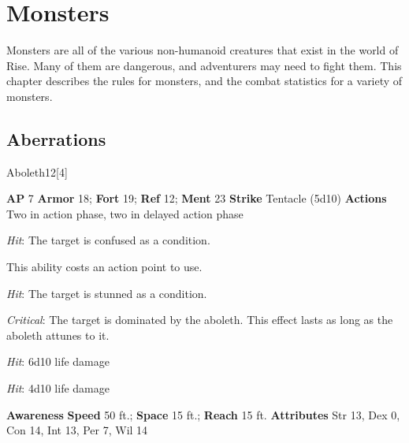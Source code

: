 \chapter{Monsters}
Monsters are all of the various non-humanoid creatures that exist in the world of Rise.
Many of them are dangerous, and adventurers may need to fight them.
This chapter describes the rules for monsters, and the combat statistics for a variety of monsters.
\section{Aberrations}
\begin{monsection}{Aboleth}{12}[4]
\vspace{-1em}\vspace{-1em}
\begin{spellcontent}
\begin{spelltargetinginfo}
{\textbf{AP} 7}
\pari \textbf{Armor} 18;
\textbf{Fort} 19;
\textbf{Ref} 12;
\textbf{Ment} 23
\pari \textbf{Strike} Tentacle  (5d10)
\pari \textbf{Actions} Two in action phase, two in delayed action phase
\end{spelltargetinginfo}
\begin{spelleffects}
\pari
{}
\par
\par \textit{Hit}: The target is confused as a condition.
\vspace{0.5em}
\pari
{}
\par
This ability costs an action point to use.
\par \textit{Hit}: The target is stunned as a condition.
\par \textit{Critical}:
The target is dominated by the aboleth.
This effect lasts as long as the aboleth attunes to it.
\vspace{0.5em}
\pari
{}
\par
\par \textit{Hit}: 6d10 life damage
\vspace{0.5em}
\pari
{}
\par
\par \textit{Hit}: 4d10 life damage
\end{spelleffects}
\end{spellcontent}
\begin{spellsubcontent}
\begin{spellfooter}
\pari \textbf{Awareness} 
\pari \textbf{Speed} 50 ft.;
\textbf{Space} 15 ft.;
\textbf{Reach} 15 ft.
\pari \textbf{Attributes}
Str 13,
Dex 0,
Con 14,
Int 13,
Per 7,
Wil 14
\end{spellfooter}
\end{spellsubcontent}
\end{monsection}
